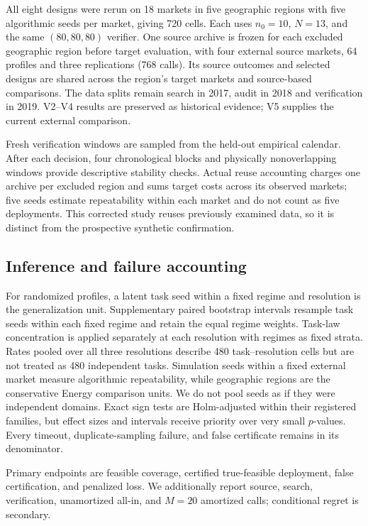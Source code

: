All eight designs were rerun on 18 markets in five geographic regions with
five algorithmic seeds per market, giving 720 cells.  Each uses $n_0=10$,
$N=13$, and the same $(80,80,80)$ verifier.  One source archive is frozen for
each excluded geographic region before target evaluation, with four external
source markets, 64 profiles and three replications (768 calls).  Its source
outcomes and selected designs are shared across the region's target markets
and source-based comparisons.  The data splits remain search in 2017, audit
in 2018 and verification in 2019.  V2--V4 results are preserved as
historical evidence; V5 supplies the current external comparison.

Fresh verification windows are sampled from the held-out empirical calendar.
After each decision, four chronological blocks and physically nonoverlapping
windows provide descriptive stability checks.  Actual reuse accounting charges
one archive per excluded region and sums target costs across its observed
markets; five seeds estimate repeatability within each market and do not count
as five deployments.  This corrected study reuses previously examined data,
so it is distinct from the prospective synthetic confirmation.

\subsection{Inference and failure accounting}

For randomized profiles, a latent task seed within a fixed regime and
resolution is the generalization unit.  Supplementary paired bootstrap
intervals resample task seeds within each fixed regime and retain the equal
regime weights.  Task-law concentration is applied separately at each resolution
with regimes as fixed strata.  Rates pooled over all three resolutions
describe 480 task--resolution cells but are not treated as 480 independent
tasks.  Simulation seeds within a fixed external market measure algorithmic
repeatability, while geographic
regions are the conservative Energy comparison units.  We do not pool seeds
as if they were independent domains.  Exact sign tests are Holm-adjusted within
their registered families, but effect sizes and intervals receive priority
over very small $p$-values.  Every timeout, duplicate-sampling failure, and
false certificate remains in its denominator.

Primary endpoints are feasible coverage, certified true-feasible deployment,
false certification, and penalized loss.  We additionally report source,
search, verification, unamortized all-in, and $M=20$ amortized calls; conditional
regret is secondary.
